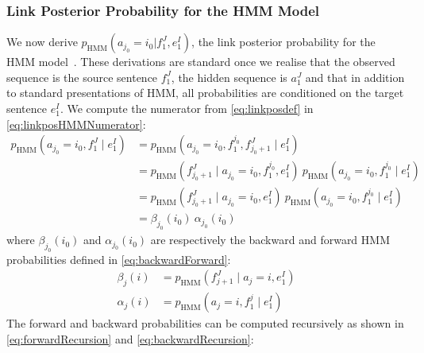 \subsubsection{Link Posterior Probability for the HMM Model}
\label{sec:linkPosteriorHMM}
We now derive $p_{\text{HMM}}(a_{j_0} = i_0 | f_1^J, e_1^I)$, the link posterior
probability for the HMM
model~\citep{vogel-ney-tillmann,rabiner:1989:IEEE}. These derivations
are standard once we realise that the observed sequence is the source
sentence $f_1^J$, the hidden sequence is $a_1^J$ and that in addition
to standard presentations of HMM, all probabilities are conditioned on
the target sentence $e_1^I$.
We compute the numerator from \autoref{eq:linkposdef} in
\autoref{eq:linkposHMMNumerator}:
%
\begin{align}
  p_{\text{HMM}}(a_{j_0} = i_0, f_1^J \mid e_1^I) &= p_{\text{HMM}}(a_{j_0} = i_0, f_1^{j_0}, f_{j_0 + 1}^J \mid e_1^I) \nonumber \\
                                               &= p_{\text{HMM}}(f_{j_0 + 1}^J \mid a_{j_0} = i_0, f_1^{j_0}, e_1^I) \ p_{\text{HMM}}(a_{j_0} = i_0, f_1^{j_0} \mid e_1^I) \nonumber \\
                                               &= p_{\text{HMM}}(f_{j_0 + 1}^J \mid a_{j_0} = i_0, e_1^I) \ p_{\text{HMM}}(a_{j_0} = i_0, f_1^{j_0} \mid e_1^I) \nonumber \\
                                               &= \beta_{j_0}(i_0) \ \alpha_{j_0}(i_0) \label{eq:linkposHMMNumerator}
\end{align}
%
where $\beta_{j_0}(i_0)$ and $\alpha_{j_0}(i_0)$ are respectively
the backward and forward HMM probabilities defined in \autoref{eq:backwardForward}:
%
\begin{equation}
  \begin{split}
    \beta_{j}(i)  &= p_{\text{HMM}}(f_{j + 1}^J \mid a_{j} = i, e_1^I) \\
    \alpha_{j}(i) &= p_{\text{HMM}}(a_{j} = i, f_1^{j} \mid e_1^I)
  \end{split}
  \label{eq:backwardForward}
\end{equation}
%
The forward and backward probabilities can be computed recursively as
shown in \autoref{eq:forwardRecursion} and \autoref{eq:backwardRecursion}:
%
